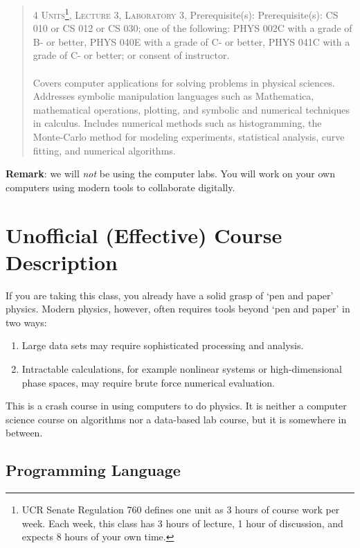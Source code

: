 \documentclass[12pt]{article}
\numberwithin{equation}{section}    %
\begin{document}
\begin{quote}
{\small
\textsc{4 Units\footnote{UCR Senate Regulation 760 defines one unit as 3 hours of course work per week. Each week, this class has 3 hours of lecture, 1 hour of discussion, and expects 8 hours of your own time.}, Lecture 3, Laboratory 3}, Prerequisite(s): Prerequisite(s): CS 010 or CS 012 or CS 030; one of the following: PHYS 002C with a grade of B- or better, PHYS 040E with a grade of C- or better, PHYS 041C with a grade of C- or better; or consent of instructor.
}
\\
\\
Covers computer applications for solving problems in physical sciences. Addresses symbolic manipulation languages such as Mathematica, mathematical operations, plotting, and symbolic and numerical techniques in calculus. Includes numerical methods such as histogramming, the Monte-Carlo method for modeling experiments, statistical analysis, curve fitting, and numerical algorithms.
\end{quote}

\noindent\textbf{Remark}: we will \emph{not} be using the computer labs. You will work on your own computers using modern tools to collaborate digitally.

\section*{Unofficial (Effective) Course Description}

If you are taking this class, you already have a solid grasp of `pen and paper' physics. Modern physics, however, often requires tools beyond `pen and paper' in two ways:
\begin{enumerate}
	\item Large data sets may require sophisticated processing and analysis.
	\item Intractable calculations, for example nonlinear systems or high-dimensional phase spaces, may require brute force numerical evaluation.
\end{enumerate}
This is a crash course in using computers to do physics. It is neither a computer science course on algorithms nor a data-based lab course, but it is somewhere in between. 




\subsection*{Programming Language}
\end{document}
